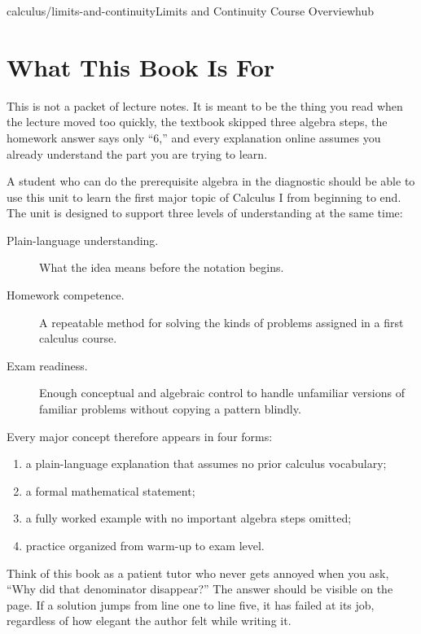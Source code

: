 \documentclass[11pt,openany]{book}
\theoremstyle{bgplain}
\begin{document}
\begin{webpage}{calculus/limits-and-continuity}{Limits and Continuity Course Overview}{hub}
\chapter*{What This Book Is For}

This is not a packet of lecture notes. It is meant to be the thing you read when the lecture moved too quickly, the textbook skipped three algebra steps, the homework answer says only ``6,'' and every explanation online assumes you already understand the part you are trying to learn.

A student who can do the prerequisite algebra in the diagnostic should be able to use this unit to learn the first major topic of Calculus I from beginning to end. The unit is designed to support three levels of understanding at the same time:

\begin{description}
  \item[Plain-language understanding.] What the idea means before the notation begins.
  \item[Homework competence.] A repeatable method for solving the kinds of problems assigned in a first calculus course.
  \item[Exam readiness.] Enough conceptual and algebraic control to handle unfamiliar versions of familiar problems without copying a pattern blindly.
\end{description}

Every major concept therefore appears in four forms:

\begin{enumerate}
  \item a plain-language explanation that assumes no prior calculus vocabulary;
  \item a formal mathematical statement;
  \item a fully worked example with no important algebra steps omitted;
  \item practice organized from warm-up to exam level.
\end{enumerate}

\begin{bgconcept}
Think of this book as a patient tutor who never gets annoyed when you ask, ``Why did that denominator disappear?'' The answer should be visible on the page. If a solution jumps from line one to line five, it has failed at its job, regardless of how elegant the author felt while writing it.
\end{bgconcept}


\end{webpage}
\end{document}
